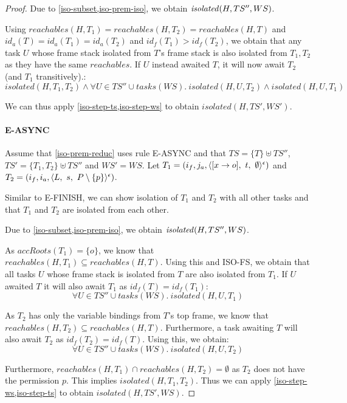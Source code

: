 \begin{proof}
Due to \cref{iso-subset,iso-prem-iso}, we obtain $\mathop{\mathit{isolated}}(H, TS'', WS)$.

Using $reachables(H, T_1) = reachables(H, T_2) = reachables(H, T)$ and $id_a(T) = id_a(T_1) = id_a(T_2)$ and $id_f(T_1) > id_f(T_2)$, we obtain that any task $U$ whose frame stack isolated from $T$'s frame stack is also isolated from $T_1, T_2$ as they have the same $reachables$. If $U$ instead awaited $T$, it will now await $T_2$ (and $T_1$ transitively).:
\[
    isolated(H, T_1, T_2) \wedge \forall U \in TS'' \cup tasks(WS).\ isolated(H, U, T_2) \wedge isolated(H, U, T_1)
\]

We can thus apply \cref{iso-step-ts,iso-step-ws} to obtain $isolated(H, TS', WS')$.

\paragraph{E-ASYNC}
Assume that \cref{iso-prem-reduc} uses rule E-ASYNC and that $TS = \{ T \} \uplus TS''$, $TS' = \{ T_1, T_2 \} \uplus TS''$ and $WS' = WS$. Let $T_1 = (i_f, j_a, \sframe[[x \rightarrow o]]{t}[\emptyset][\epsilon])$ and $T_2 = (i_f, i_a, \sframe{s}[P\setminus \{p\}][\epsilon])$.

Similar to E-FINISH, we can show isolation of $T_1$ and $T_2$ with all other tasks and that $T_1$ and $T_2$ are isolated from each other.

Due to \cref{iso-subset,iso-prem-iso}, we obtain $\mathop{\mathit{isolated}}(H, TS'', WS)$.

As $accRoots(T_1) = \{o\}$, we know that $reachables(H, T_1) \subseteq reachables(H, T)$. Using this and ISO-FS, we obtain that all tasks $U$ whose frame stack is isolated from $T$ are also isolated from $T_1$. If $U$ awaited $T$ it will also await $T_1$ as $id_f(T) = id_f(T_1)$:
\[
    \forall U \in TS'' \cup tasks(WS).\ isolated(H, U, T_1)
\]

As $T_2$ has only the variable bindings from $T$'s top frame, we know that $reachables(H, T_2) \subseteq reachables(H, T)$. Furthermore, a task awaiting $T$ will also await $T_2$ as $id_f(T_2) = id_f(T)$. Using this, we obtain:
\[
    \forall U \in TS'' \cup tasks(WS).\ isolated(H, U, T_2)
\]

Furthermore, $reachables(H, T_1) \cap reachables(H, T_2) = \emptyset$ as $T_2$ does not have the permission $p$. This implies $isolated(H, T_1, T_2)$. Thus we can apply \cref{iso-step-ws,iso-step-ts} to obtain $isolated(H, TS', WS)$.



\end{proof}
